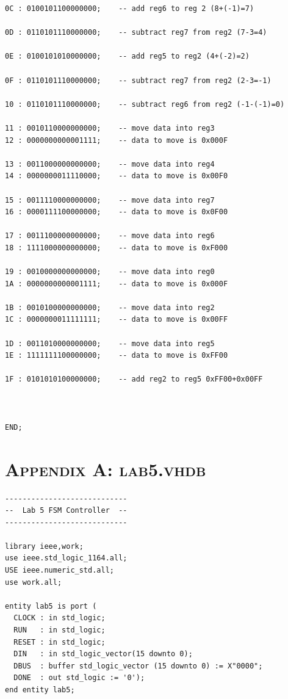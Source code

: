 \documentclass[11pt]{report}
\begin{document}
\begin{spacing}{1.5}
\begin{lstlisting}
0C : 0100101100000000;    -- add reg6 to reg 2 (8+(-1)=7)

0D : 0110101110000000;    -- subtract reg7 from reg2 (7-3=4)

0E : 0100101010000000;    -- add reg5 to reg2 (4+(-2)=2)

0F : 0110101110000000;    -- subtract reg7 from reg2 (2-3=-1)

10 : 0110101110000000;    -- subtract reg6 from reg2 (-1-(-1)=0)

11 : 0010110000000000;    -- move data into reg3
12 : 0000000000001111;    -- data to move is 0x000F

13 : 0011000000000000;    -- move data into reg4
14 : 0000000011110000;    -- data to move is 0x00F0

15 : 0011110000000000;    -- move data into reg7
16 : 0000111100000000;    -- data to move is 0x0F00

17 : 0011100000000000;    -- move data into reg6
18 : 1111000000000000;    -- data to move is 0xF000

19 : 0010000000000000;    -- move data into reg0
1A : 0000000000001111;    -- data to move is 0x000F

1B : 0010100000000000;    -- move data into reg2
1C : 0000000011111111;    -- data to move is 0x00FF

1D : 0011010000000000;    -- move data into reg5
1E : 1111111100000000;    -- data to move is 0xFF00

1F : 0101010100000000;    -- add reg2 to reg5 0xFF00+0x00FF



END;
\end{lstlisting}

\chapter*{\scshape Appendix A: lab5.vhdb}
\label{app:a}
\vspace{15px}
\begin{lstlisting}
----------------------------
--  Lab 5 FSM Controller  --
----------------------------

library ieee,work;
use ieee.std_logic_1164.all;
USE ieee.numeric_std.all;
use work.all;

entity lab5 is port (
  CLOCK : in std_logic;
  RUN   : in std_logic;
  RESET : in std_logic;
  DIN   : in std_logic_vector(15 downto 0);
  DBUS  : buffer std_logic_vector (15 downto 0) := X"0000"; 
  DONE  : out std_logic := '0');
end entity lab5;


\end{lstlisting}
\end{spacing}
\end{document}

